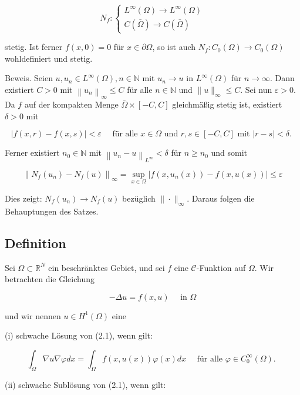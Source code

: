 \documentclass[10pt, letterpaper]{article}
\begin{document}
$$
N_{f}:\left\{\begin{array}{l}
L^{\infty}(\Omega) \rightarrow L^{\infty}(\Omega) \\
C(\bar{\Omega}) \rightarrow C(\bar{\Omega})
\end{array}\right.
$$

stetig. Ist ferner $f(x, 0)=0$ für $x \in \partial \Omega$, so ist auch $N_{f}: C_{0}(\Omega) \rightarrow C_{0}(\Omega)$ wohldefiniert und stetig.

Beweis. Seien $u, u_{n} \in L^{\infty}(\Omega), n \in \mathbb{N}$ mit $u_{n} \rightarrow u$ in $L^{\infty}(\Omega)$ für $n \rightarrow \infty$. Dann existiert $C>0$ mit $\left\|u_{n}\right\|_{\infty} \leq C$ für alle $n \in \mathbb{N}$ und $\|u\|_{\infty} \leq C$. Sei nun $\varepsilon>0$. Da $f$ auf der kompakten Menge $\bar{\Omega} \times[-C, C]$ gleichmäßig stetig ist, existiert $\delta>0$ mit

$$
|f(x, r)-f(x, s)|<\varepsilon \quad \text { für alle } x \in \Omega \text { und } r, s \in[-C, C] \text { mit }|r-s|<\delta \text {. }
$$

Ferner existiert $n_{0} \in \mathbb{N}$ mit $\left\|u_{n}-u\right\|_{L^{\infty}}<\delta$ für $n \geq n_{0}$ und somit

$$
\left\|N_{f}\left(u_{n}\right)-N_{f}(u)\right\|_{\infty}=\sup _{x \in \Omega}\left|f\left(x, u_{n}(x)\right)-f(x, u(x))\right| \leq \varepsilon
$$

Dies zeigt: $N_{f}\left(u_{n}\right) \rightarrow N_{f}(u)$ bezüglich $\|\cdot\|_{\infty}$. Daraus folgen die Behauptungen des Satzes.

\subsection*{Definition}

Sei $\Omega \subset \mathbb{R}^{N}$ ein beschränktes Gebiet, und sei $f$ eine $\mathcal{C}$-Funktion auf $\Omega$. Wir betrachten die Gleichung

$$
-\Delta u=f(x, u) \quad \text { in } \Omega
$$

und wir nennen $u \in H^{1}(\Omega)$ eine

(i) schwache Lösung von (2.1), wenn gilt:

$$
\int_{\Omega} \nabla u \nabla \varphi d x=\int_{\Omega} f(x, u(x)) \varphi(x) d x \quad \text { für alle } \varphi \in C_{0}^{\infty}(\Omega) \text {. }
$$

(ii) schwache Sublösung von (2.1), wenn gilt:
\end{document}
